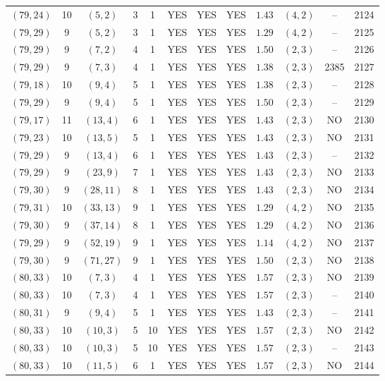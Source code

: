 \begin{longtable}{|c|c|c|c|c|c|c|c|c|c|c|c|}
$(79,24)$ & 10 & $(5,2)$ & 3 & 1 & YES & YES & YES & $1.43$ & $(4,2)$ & -- & 2124\\
$(79,29)$ & 9 & $(5,2)$ & 3 & 1 & YES & YES & YES & $1.29$ & $(4,2)$ & -- & 2125\\
$(79,29)$ & 9 & $(7,2)$ & 4 & 1 & YES & YES & YES & $1.50$ & $(2,3)$ & -- & 2126\\
$(79,29)$ & 9 & $(7,3)$ & 4 & 1 & YES & YES & YES & $1.38$ & $(2,3)$ & 2385 & 2127\\
$(79,18)$ & 10 & $(9,4)$ & 5 & 1 & YES & YES & YES & $1.38$ & $(2,3)$ & -- & 2128\\
$(79,29)$ & 9 & $(9,4)$ & 5 & 1 & YES & YES & YES & $1.50$ & $(2,3)$ & -- & 2129\\
$(79,17)$ & 11 & $(13,4)$ & 6 & 1 & YES & YES & YES & $1.43$ & $(2,3)$ & NO & 2130\\
$(79,23)$ & 10 & $(13,5)$ & 5 & 1 & YES & YES & YES & $1.43$ & $(2,3)$ & NO & 2131\\
$(79,29)$ & 9 & $(13,4)$ & 6 & 1 & YES & YES & YES & $1.43$ & $(2,3)$ & -- & 2132\\
$(79,29)$ & 9 & $(23,9)$ & 7 & 1 & YES & YES & YES & $1.43$ & $(2,3)$ & NO & 2133\\
$(79,30)$ & 9 & $(28,11)$ & 8 & 1 & YES & YES & YES & $1.43$ & $(2,3)$ & NO & 2134\\
$(79,31)$ & 10 & $(33,13)$ & 9 & 1 & YES & YES & YES & $1.29$ & $(4,2)$ & NO & 2135\\
$(79,30)$ & 9 & $(37,14)$ & 8 & 1 & YES & YES & YES & $1.29$ & $(4,2)$ & NO & 2136\\
$(79,29)$ & 9 & $(52,19)$ & 9 & 1 & YES & YES & YES & $1.14$ & $(4,2)$ & NO & 2137\\
$(79,30)$ & 9 & $(71,27)$ & 9 & 1 & YES & YES & YES & $1.50$ & $(2,3)$ & NO & 2138\\
$(80,33)$ & 10 & $(7,3)$ & 4 & 1 & YES & YES & YES & $1.57$ & $(2,3)$ & NO & 2139\\
$(80,33)$ & 10 & $(7,3)$ & 4 & 1 & YES & YES & YES & $1.57$ & $(2,3)$ & -- & 2140\\
$(80,31)$ & 9 & $(9,4)$ & 5 & 1 & YES & YES & YES & $1.43$ & $(2,3)$ & -- & 2141\\
$(80,33)$ & 10 & $(10,3)$ & 5 & 10 & YES & YES & YES & $1.57$ & $(2,3)$ & NO & 2142\\
$(80,33)$ & 10 & $(10,3)$ & 5 & 10 & YES & YES & YES & $1.57$ & $(2,3)$ & -- & 2143\\
$(80,33)$ & 10 & $(11,5)$ & 6 & 1 & YES & YES & YES & $1.57$ & $(2,3)$ & NO & 2144\\

\end{longtable}
